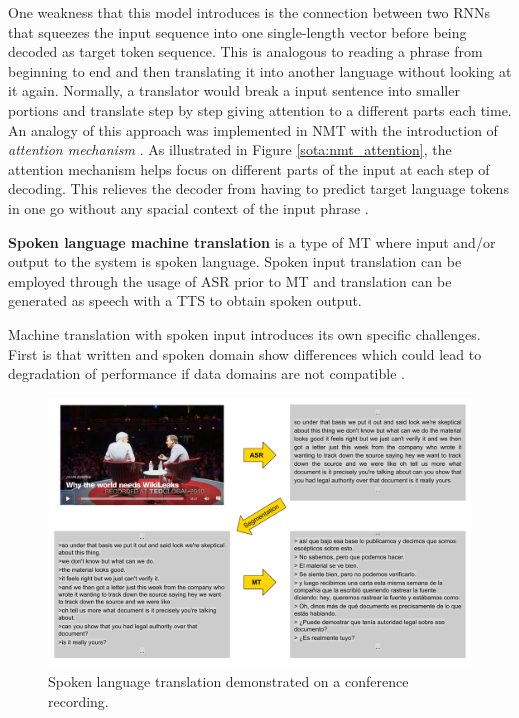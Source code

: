 One weakness that this model introduces is the connection between two RNNs that squeezes the input sequence into one single-length vector before being decoded as target token sequence. This is analogous to reading a phrase from beginning to end and then translating it into another language without looking at it again. Normally, a translator would break a input sentence into smaller portions and translate step by step giving attention to a different parts each time. An analogy of this approach was implemented in NMT with the introduction of \textit{attention mechanism} \citep{bahdanau, luong}. As illustrated in Figure \ref{sota:nmt_attention}, the attention mechanism helps focus on different parts of the input at each step of decoding. This relieves the decoder from having to predict target language tokens in one go without any spacial context of the input phrase \citep{google_nmt}. 

\textbf{Spoken language machine translation} is a type of MT where input and/or output to the system is spoken language. Spoken input translation can be employed through the usage of ASR prior to MT and translation can be generated as speech with a TTS to obtain spoken output. 

Machine translation with spoken input introduces its own specific challenges. First is that written and spoken domain show differences which could lead to degradation of performance if data domains are not compatible \citep{britz}. 

\begin{figure}[t]
  \centering
  \includegraphics[width=\linewidth]{img/slmt_on_ted.pdf}
  \caption{Spoken language translation demonstrated on a conference recording.}
  \label{sota:tv_transcription}
\end{figure}

